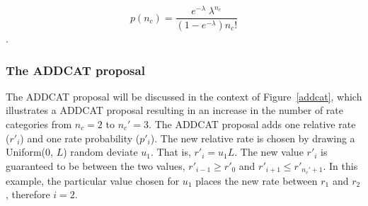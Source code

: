 \documentclass[12pt]{article}
\newcommand{\ncat}{n_c}
\begin{document}
\[ p(\ncat) = \frac{e^{-\lambda} \; \lambda^{\ncat}}{\left( 1 - e^{-\lambda} \right) {\ncat}!}  \].

%


\subsubsection{The ADDCAT proposal}

The ADDCAT proposal will be discussed in the context of Figure~\ref{addcat}, which illustrates a ADDCAT proposal resulting in an increase in the number of rate categories from $\ncat = 2$ to $\ncat' = 3$. The ADDCAT proposal adds one relative rate ($r'_i$) and one rate probability ($p'_i$). The new relative rate is chosen by drawing a Uniform(0, $L$) random deviate $u_1$. That is, $r'_i = u_1 L$. The new value $r'_i$ is guaranteed to be between the two values, $r'_{i-1} \ge r'_0$ and $r'_{i+1} \le r'_{\ncat'+1}$. In this example, the particular value chosen for $u_1$ places the new rate between $r_1$ and $r_2$, therefore $i=2$.
\end{document}
